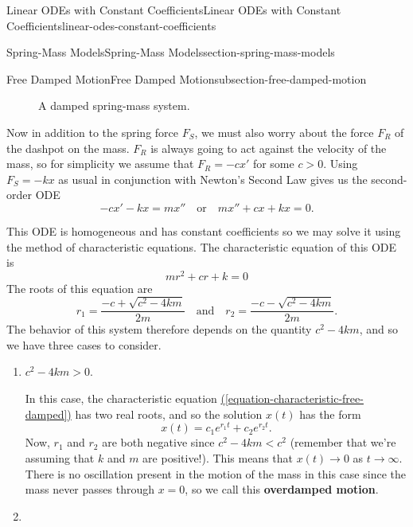 \documentclass[oneside,10pt,]{book}
\newcommand{\terminology}[1]{\textbf{#1}}
\numberwithin{equation}{section}
\newcommand{\lt}{<}
\newcommand{\gt}{>}
\begin{document}
\begin{chapterptx}{Linear ODEs with Constant Coefficients}{}{Linear ODEs with Constant Coefficients}{}{}{linear-odes-constant-coefficients}
\begin{sectionptx}{Spring-Mass Models}{}{Spring-Mass Models}{}{}{section-spring-mass-models}
\begin{subsectionptx}{Free Damped Motion}{}{Free Damped Motion}{}{}{subsection-free-damped-motion}
\begin{figure}
{\begin{tikzpicture}
\end{tikzpicture}
}
\caption{A damped spring-mass system.\label{figure-damped-spring}}
\end{figure}
\hypertarget{p-210}{}%
Now in addition to the spring force \(F_{S}\), we must also worry about the force \(F_{R}\) of the dashpot on the mass. \(F_{R}\) is always going to act against the velocity of the mass, so for simplicity we assume that \(F_{R} = -cx'\) for some \(c > 0\). Using \(F_{S} = -kx\) as usual in conjunction with Newton's Second Law gives us the second-order ODE%
\begin{equation*}
-cx'-kx = mx''\quad\text{or}\quad mx'' + cx + kx = 0.
\end{equation*}
%
\par
\hypertarget{p-211}{}%
This ODE is homogeneous and has constant coefficients so we may solve it using the method of characteristic equations. The characteristic equation of this ODE is%
\begin{equation}
mr^{2} + cr + k = 0\label{equation-characteristic-free-damped}
\end{equation}
The roots of this equation are%
\begin{equation}
r_{1} = \frac{-c + \sqrt{c^{2} - 4km}}{2m}\quad\text{and}\quad r_{2} = \frac{-c - \sqrt{c^{2} - 4km}}{2m}.\label{equation-characteristic-free-damped-roots}
\end{equation}
The behavior of this system therefore depends on the quantity \(c^{2} - 4km\), and so we have three cases to consider.%
\leavevmode%
\begin{enumerate}[label=\arabic*:]
\item\hypertarget{li-17}{}\hypertarget{p-212}{}%
\(c^{2} - 4km \gt 0\).%
\par
\hypertarget{p-213}{}%
In this case, the characteristic equation \hyperref[equation-characteristic-free-damped]{(\ref{equation-characteristic-free-damped})} has two real roots, and so the solution \(x(t)\) has the form%
\begin{equation*}
x(t) = c_{1}e^{r_{1}t} + c_{2}e^{r_{2}t}.
\end{equation*}
Now, \(r_{1}\) and \(r_{2}\) are both negative since \(c^{2} - 4km \lt c^{2}\) (remember that we're assuming that \(k\) and \(m\) are positive!). This means that \(x(t)\to0\) as \(t\to\infty\). There is no oscillation present in the motion of the mass in this case since the mass never passes through \(x = 0\), so we call this \terminology{overdamped motion}.%
\item\hypertarget{li-18}{}\hypertarget{p-214}{}%

\end{enumerate}
\end{subsectionptx}
\end{sectionptx}
\end{chapterptx}
\end{document}
